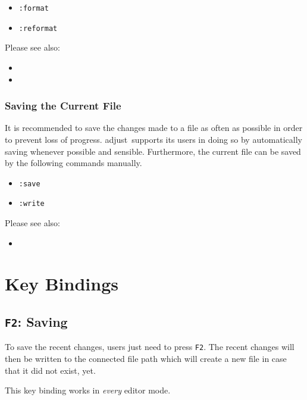 \documentclass[11pt, a4paper, british]{scrartcl}
\DeclareRobustCommand{\adjust}{\textsf{adjust}}
\begin{document}
\begin{itemize}
\item \texttt{:format}
\item \texttt{:reformat}
\end{itemize}

Please see also:

\begin{itemize}
\item {}
\item {}
\end{itemize}

\subsubsection{Saving the Current File}
\label{sec:saving-the-current-file}
It is recommended to save the changes made to a file as often as possible in
order to prevent loss of progress.  \adjust\ supports its users in doing so by
automatically saving whenever possible and sensible.  Furthermore, the current
file can be saved by the following commands manually.

\begin{itemize}
\item \texttt{:save}
\item \texttt{:write}
\end{itemize}

Please see also:

\begin{itemize}
\item {}
\end{itemize}


\newpage
\section{Key Bindings}
\label{sec:key-bindings}
\subsection{\texttt{F2}:  Saving}
\label{sec:f2-saving}
To save the recent changes, users just need to press \texttt{F2}.  The recent
changes will then be written to the connected file path which will create a new
file in case that it did not exist, yet.

This key binding works in \emph{every} editor mode.
\end{document}
